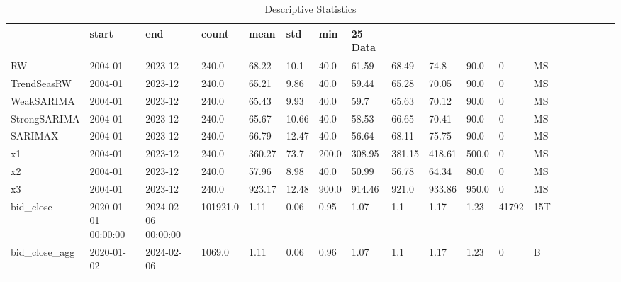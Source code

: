 \begin{table}
\caption{Descriptive Statistics}
\begin{tabular}{lllllllllllll}
\toprule
 & start & end & count & mean & std & min & 25%
Data &  &  &  &  &  &  &  &  &  &  &  &  \\
\midrule
RW & 2004-01 & 2023-12 & 240.0 & 68.22 & 10.1 & 40.0 & 61.59 & 68.49 & 74.8 & 90.0 & 0 & MS \\
TrendSeasRW & 2004-01 & 2023-12 & 240.0 & 65.21 & 9.86 & 40.0 & 59.44 & 65.28 & 70.05 & 90.0 & 0 & MS \\
WeakSARIMA & 2004-01 & 2023-12 & 240.0 & 65.43 & 9.93 & 40.0 & 59.7 & 65.63 & 70.12 & 90.0 & 0 & MS \\
StrongSARIMA & 2004-01 & 2023-12 & 240.0 & 65.67 & 10.66 & 40.0 & 58.53 & 66.65 & 70.41 & 90.0 & 0 & MS \\
SARIMAX & 2004-01 & 2023-12 & 240.0 & 66.79 & 12.47 & 40.0 & 56.64 & 68.11 & 75.75 & 90.0 & 0 & MS \\
x1 & 2004-01 & 2023-12 & 240.0 & 360.27 & 73.7 & 200.0 & 308.95 & 381.15 & 418.61 & 500.0 & 0 & MS \\
x2 & 2004-01 & 2023-12 & 240.0 & 57.96 & 8.98 & 40.0 & 50.99 & 56.78 & 64.34 & 80.0 & 0 & MS \\
x3 & 2004-01 & 2023-12 & 240.0 & 923.17 & 12.48 & 900.0 & 914.46 & 921.0 & 933.86 & 950.0 & 0 & MS \\
bid_close & 2020-01-01 00:00:00 & 2024-02-06 00:00:00 & 101921.0 & 1.11 & 0.06 & 0.95 & 1.07 & 1.1 & 1.17 & 1.23 & 41792 & 15T \\
bid_close_agg & 2020-01-02 & 2024-02-06 & 1069.0 & 1.11 & 0.06 & 0.96 & 1.07 & 1.1 & 1.17 & 1.23 & 0 & B \\
\bottomrule
\end{tabular}
\end{table}
